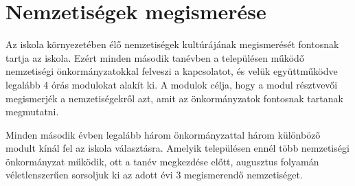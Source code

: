 \hypertarget{nemzetisegek-megismerese}{%
\section{Nemzetiségek megismerése}\label{nemzetisegek-megismerese}}

Az iskola környezetében élő nemzetiségek kultúrájának megismerését\break
fontosnak tartja az iskola. Ezért minden második tanévben a településen
működő nemzetiségi önkormányzatokkal felveszi a kapcsolatot, és velük
együttműködve legalább 4 órás modulokat alakít ki. A modulok célja, hogy
a modul résztvevői megismerjék a nemzetiségekről azt, amit az
önkormányzatok fontosnak tartanak megmutatni.

Minden második évben legalább három önkormányzattal három különböző
modult kínál fel az iskola választásra. Amelyik településen ennél több
nemzetiségi önkormányzat működik, ott a tanév megkezdése előtt,
augusztus folyamán véletlenszerűen sorsoljuk ki az adott évi 3
megismerendő nemzetiséget.
